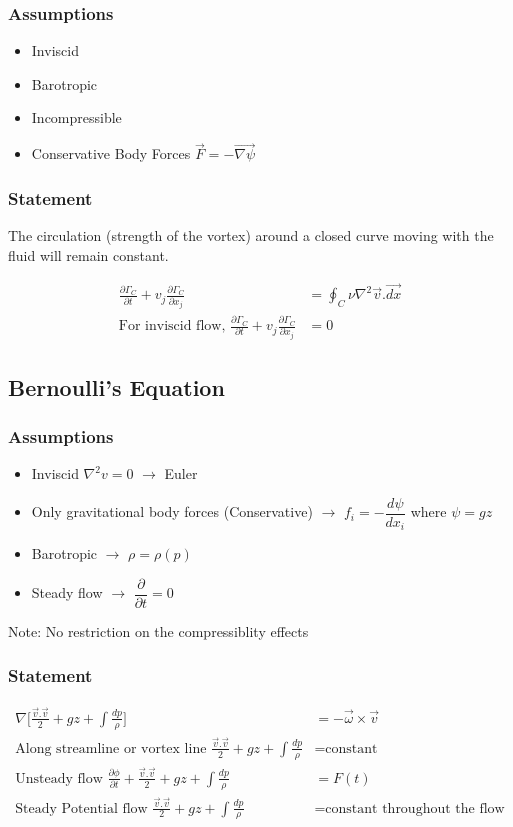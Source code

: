 \documentclass[10pt, letterpaper, notitlepage, landscape]{article}
\begin{document}
\subsubsection{Assumptions}
\begin{itemize}
\item Inviscid
\item Barotropic
\item Incompressible
\item Conservative Body Forces $\vec{F} = -\vec{\nabla{\psi}}$
\end{itemize}

\subsubsection{Statement}
The circulation (strength of the vortex) around a closed curve moving with the fluid will remain constant.

\begin{align*}
\frac{\partial \Gamma_C}{\partial t} + v_j \frac{\partial \Gamma_C}{\partial x_j} &= \oint_{C}^{} \nu \nabla^2\vec{v}.\vec{dx} \\
\text{For inviscid flow, } \frac{\partial \Gamma_C}{\partial t} + v_j \frac{\partial \Gamma_C}{\partial x_j} &= 0
\end{align*}

\subsection{Bernoulli's Equation}
\subsubsection{Assumptions}
\begin{itemize}
\item Inviscid $\nabla^2 v = 0$ $\rightarrow$ Euler
\item Only gravitational body forces (Conservative) $\rightarrow$ $f_i = -\dfrac{d \psi}{dx_i}$ where $\psi = g z$
\item Barotropic $\rightarrow$ $\rho = \rho(p)$
\item Steady flow $\rightarrow$ $\dfrac{\partial}{\partial t} = 0$ 
\end{itemize}
Note: No restriction on the compressiblity effects

\subsubsection{Statement}
\begin{align*}
\nabla \Biggl[\frac{\vec{v}.\vec{v}}{2} + g z + \int \frac{dp}{\rho} \Biggr] &= -\vec{\omega} \times \vec{v} \\
\text{Along streamline or vortex line } \frac{\vec{v}.\vec{v}}{2} + g z + \int \frac{dp}{\rho} &= \text{constant}\\
\text{Unsteady flow } \frac{\partial \phi}{\partial t} + \frac{\vec{v}.\vec{v}}{2} + g z + \int \frac{dp}{\rho} &= F(t)\\
\text{Steady Potential flow } \frac{\vec{v}.\vec{v}}{2} + g z + \int \frac{dp}{\rho} &= \text{constant throughout the flow}\\
\end{align*}
\end{document}

